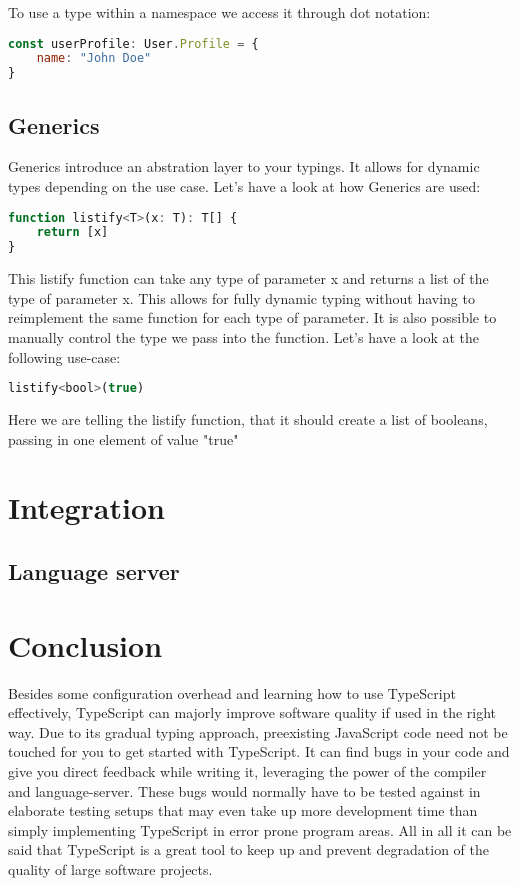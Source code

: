 \documentclass[letterpaper,runningheads]{llncs}
\begin{document}
To use a type within a namespace we access it through dot notation:

\begin{lstlisting}[style=ES6, language=JavaScript, caption="Variadic Tuples"]
const userProfile: User.Profile = {
	name: "John Doe"
}
\end{lstlisting}

\subsection{Generics}

Generics introduce an abstration layer to your typings. It allows
for dynamic types depending on the use case. Let's have a look at
how Generics are used:

\begin{lstlisting}[style=ES6, language=JavaScript, caption="Variadic Tuples"]
function listify<T>(x: T): T[] {
	return [x]
}
\end{lstlisting}

This listify function can take any type of parameter x and returns a list of the type of parameter x. This allows for fully dynamic typing without having to reimplement the same function for each type of parameter. It is also possible to manually control the type we pass into the function. Let's have a look at the following use-case:

\begin{lstlisting}[style=ES6, language=JavaScript, caption="Variadic Tuples"]
listify<bool>(true)
\end{lstlisting}

Here we are telling the listify function, that it should create a list of booleans, passing in one element of value "true"

\section{Integration}

\subsection{Language server}

\section{Conclusion}

Besides some configuration overhead and learning how to use TypeScript effectively, TypeScript can majorly improve software quality if used in the right way. Due to its gradual typing approach, preexisting JavaScript code need not be touched for you to get started with TypeScript. It can find bugs in your code and give you direct feedback while writing it, leveraging the power of the compiler and language-server. These bugs would normally have to be tested against in elaborate testing setups that may even take up more development time than simply implementing TypeScript in error prone program areas. All in all it can be said that TypeScript is a great tool to keep up and prevent degradation of the quality of large software projects.  
\end{document}
